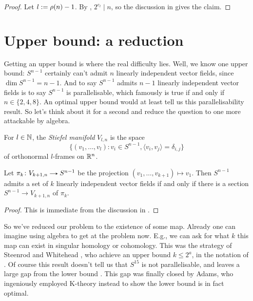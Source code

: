 \begin{proof}
  Let $l \mathrel{:=} \rho(n)-1$. By , $2^{e_l} \mid n$, so the
  discussion in  gives the claim.
\end{proof}


\section{Upper bound: a reduction}

Getting an upper bound is where the real difficulty lies. Well, we
know one upper bound: $S^{n-1}$ certainly can't admit $n$ linearly
independent vector fields, since $\dim S^{n-1} = n - 1$. And to say
$S^{n-1}$ admits $n-1$ linearly independent vector fields is to say
$S^{n-1}$ is parallelisable, which famously is true if and only if $n
\in \{2,4,8\}$. An optimal upper bound would at least tell us this
parallelisability result. So let's think about it for a second and
reduce the question to one more attackable by algebra.

\begin{definition}
  \label{stiefel}
  For $l \in \mathbb{N}$, the \emph{Stiefel manifold} $V_{l,n}$ is the space
  \[
  \{(v_1,\ldots,v_l) : v_i \in S^{n-1}, \langle v_i, v_j \rangle =
  \delta_{i,j}\}
  \]
  of orthonormal $l$-frames on $\mathbb{R}^n$.
\end{definition}

\begin{lemma}
  \label{section-reduction}
  Let $\pi_k \c V_{k+1,n} \to S^{n-1}$ be the projection
  $(v_1,\ldots,v_{k+1}) \mapsto v_1$. Then $S^{n-1}$ admits a set of
  $k$ linearly independent vector fields if and only if there is a
  section $S^{n-1} \to V_{k+1,n}$ of $\pi_k$.
\end{lemma}

\begin{proof}
  This is immediate from the discussion in .
\end{proof}

So we've reduced our problem to the existence of some map. Already one
can imagine using algebra to get at the problem now. E.g., we can ask
for what $k$ this map can exist in singular homology or
cohomology. This was the strategy of Steenrod and Whitehead
\cite{steenrod-vfields}, who achieve an upper bound $k \le 2^a$, in
the notation of . Of course this result doesn't
tell us that $S^{15}$ is not parallelisable, and leaves a large gap
from the lower bound . This gap was finally
closed by Adams, who ingeniously employed K-theory instead to show the
lower bound  is in fact optimal.

